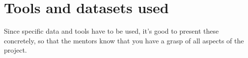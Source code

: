 \chapter{Tools and datasets used}
Since specific data and tools have to be used, it’s good to present these concretely, so that the mentors know that you have a grasp of all aspects of the project.